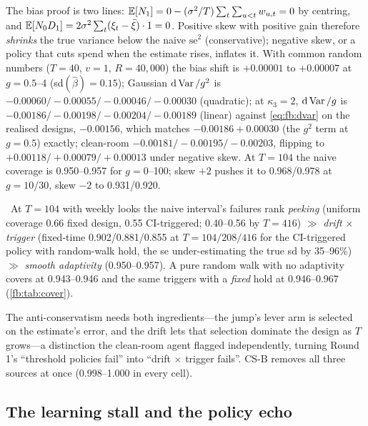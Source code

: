 The bias proof is two lines: $\mathbb{E}[N_1] = 0 - (\sigma^2/T)\sum_t\sum_{u<t}w_{u,t} = 0$ by centring, and $\mathbb{E}[N_0D_1] = 2\sigma^2\sum_t(\xi_t - \bar\xi)\cdot1 = 0$. Positive skew with positive gain therefore \emph{shrinks} the true variance below the naive $\mathrm{se}^2$ (conservative); negative skew, or a policy that cuts spend when the estimate rises, inflates it. With common random numbers ($T = 40$, $v = 1$, $R = 40{,}000$) the bias shift is $+0.00001$ to $+0.00007$ at $g = 0.5$--4 (sd$(\hat\beta) = 0.15$); Gaussian $\mathrm{d}\operatorname{Var}/g^2$ is $-0.00060/-0.00055/-0.00046/-0.00030$ (quadratic); at $\kappa_3 = 2$, $\mathrm{d}\operatorname{Var}/g$ is $-0.00186/-0.00198/-0.00204/-0.00189$ (linear) against \cref{eq:fb:dvar} on the realised designs, $-0.00156$, which matches $-0.00186 + 0.00030$ (the $g^2$ term at $g = 0.5$) exactly; clean-room $-0.00181/-0.00195/-0.00203$, flipping to $+0.00118/+0.00079/+0.00013$ under negative skew. At $T = 104$ the naive coverage is 0.950--0.957 for $g = 0$--100; skew $+2$ pushes it to 0.968/0.978 at $g = 10/30$, skew $-2$ to 0.931/0.920.

\begin{proposition}
\label{fb:prop:taxonomy}
\tagNumerical\ At $T = 104$ with weekly looks the naive interval's failures rank \emph{peeking} (uniform coverage 0.66 fixed design, 0.55 CI-triggered; 0.40--0.56 by $T = 416$) $\gg$ \emph{drift $\times$ trigger} (fixed-time 0.902/0.881/0.855 at $T = 104/208/416$ for the CI-triggered policy with random-walk hold, the se under-estimating the true sd by 35--96\%) $\gg$ \emph{smooth adaptivity} (0.950--0.957). A pure random walk with no adaptivity covers at 0.943--0.946 and the same triggers with a \emph{fixed} hold at 0.946--0.967 (\cref{fb:tab:cover}).
\end{proposition}

The anti-conservatism needs both ingredients---the jump's lever arm is selected on the estimate's error, and the drift lets that selection dominate the design as $T$ grows---a distinction the clean-room agent flagged independently, turning Round 1's ``threshold policies fail'' into ``drift $\times$ trigger fails''. CS-B removes all three sources at once (0.998--1.000 in every cell).

\subsection{The learning stall and the policy echo}

